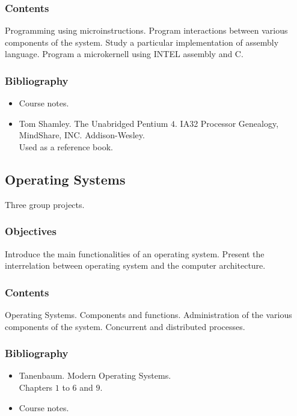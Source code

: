 \documentclass[spanish]{article}
\begin{document}
\subsubsection{Contents}
Programming using microinstructions. Program interactions between various
components of the system. Study a particular implementation of assembly language.
Program a microkernell using INTEL assembly and C.

\subsubsection{Bibliography}
\begin{itemize}
  \item Course notes.
  \item Tom Shamley. The Unabridged Pentium $4$. IA32 Processor Genealogy, MindShare, INC. Addison-Wesley.\\
    Used as a reference book.
\end{itemize}


\hrulefill%

\subsection{Operating Systems}
Three group projects.

\subsubsection{Objectives}
Introduce the main functionalities of an operating system. Present the interrelation
between operating system and the computer architecture.

\subsubsection{Contents}
Operating Systems. Components and functions. Administration of the various components
of the system. Concurrent and distributed processes.

\subsubsection{Bibliography}
\begin{itemize}
  \item Tanenbaum. Modern Operating Systems.\\
    Chapters $1$ to $6$ and $9$.
  \item Course notes.
\end{itemize}
\end{document}
